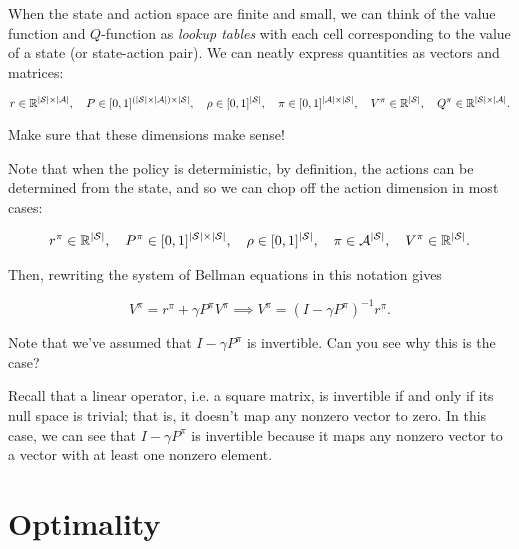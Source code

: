 \documentclass[../main/main]{subfiles}
\begin{document}
When the state and action space are finite and small, we can think of the value function and $Q$-function as \emph{lookup tables} with each cell corresponding to the value of a state (or state-action pair). We can neatly express quantities as vectors and matrices:

\[
    r \in \mathbb{R}^{|\mathcal{S}| \times |\mathcal{A}|}, \quad P \in [0, 1]^{(|\mathcal{S}| \times |\mathcal{A}|) \times |\mathcal{S}|}, \quad \rho \in [0, 1]^{|\mathcal{S}|}, \quad \pi \in [0, 1]^{|\mathcal{A}| \times |\mathcal{S}|}, \quad V^\pi \in \mathbb{R}^{|\mathcal{S}|}, \quad Q^\pi \in \mathbb{R}^{|\mathcal{S}| \times |\mathcal{A}|}.
\]

Make sure that these dimensions make sense!

Note that when the policy is deterministic, by definition, the actions can be determined from the state, and so we can chop off the action dimension in most cases:

\begin{align*}
    r^{\pi} \in \mathbb{R}^{|\mathcal{S}|}, \quad P^{\pi} \in [0, 1]^{|\mathcal{S}| \times |\mathcal{S}|}, \quad \rho \in [0, 1]^{|\mathcal{S}|}, \quad \pi \in \mathcal{A}^{|\mathcal{S}|}, \quad V^\pi \in \mathbb{R}^{|\mathcal{S}|}.
\end{align*}

Then, rewriting the system of Bellman equations in this notation gives

\[
    V^\pi = r^\pi + \gamma P^\pi V^\pi \implies V^\pi = (I - \gamma P^\pi)^{-1} r^\pi.
\]

Note that we've assumed that $I - \gamma P^\pi$ is invertible. Can you see why this is the case?

Recall that a linear operator, i.e. a square matrix, is invertible if and only if its null space is trivial; that is, it doesn't map any nonzero vector to zero. In this case, we can see that $I - \gamma P^\pi$ is invertible because it maps any nonzero vector to a vector with at least one nonzero element.








\section{Optimality}
\end{document}
